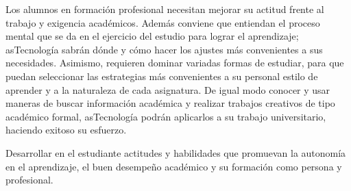 \begin{syllabus}


\begin{justification}
Los alumnos en formación profesional necesitan mejorar su actitud frente al trabajo y exigencia académicos. Además conviene que entiendan el proceso mental que se da en el ejercicio del estudio para lograr el aprendizaje; asTecnología  sabrán dónde y cómo hacer los ajustes más convenientes a sus necesidades. Asimismo, requieren dominar variadas formas de estudiar, para que puedan seleccionar las estrategias  más convenientes a su personal estilo de aprender y a la naturaleza de cada asignatura. De igual modo conocer y usar  maneras de buscar información académica y realizar trabajos creativos de tipo académico formal, asTecnología podrán  aplicarlos a su trabajo universitario, haciendo exitoso su esfuerzo.
\end{justification}

\begin{goals}
\item Desarrollar en el estudiante actitudes y habilidades que promuevan la autonomía en el aprendizaje, el buen desempeño académico y su formación como persona y profesional.
\end{goals}

\begin{outcomes}
    \item {}
    \item {}
    \item {}
\end{outcomes}

\begin{competences}
    \item {}
    \item {}
\end{competences}


\end{syllabus}
